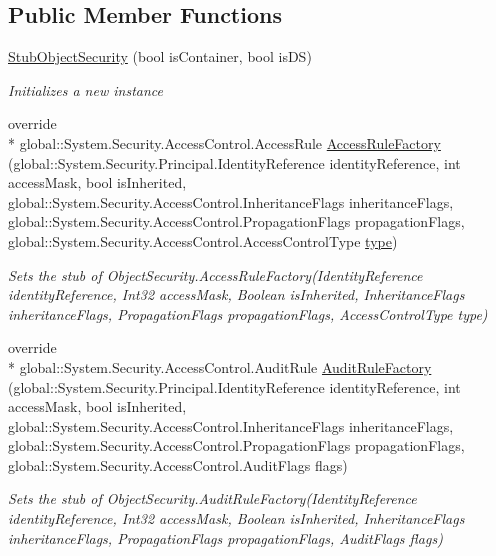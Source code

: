 \subsection*{Public Member Functions}
\begin{DoxyCompactItemize}
\item 
\hyperlink{class_system_1_1_security_1_1_access_control_1_1_fakes_1_1_stub_object_security_a90af0874159857fc604873cff276dc73}{Stub\-Object\-Security} (bool is\-Container, bool is\-D\-S)
\begin{DoxyCompactList}\small\item\em Initializes a new instance\end{DoxyCompactList}\item 
override \\*
global\-::\-System.\-Security.\-Access\-Control.\-Access\-Rule \hyperlink{class_system_1_1_security_1_1_access_control_1_1_fakes_1_1_stub_object_security_adc29237b5d47a9d024d2fd27999d512f}{Access\-Rule\-Factory} (global\-::\-System.\-Security.\-Principal.\-Identity\-Reference identity\-Reference, int access\-Mask, bool is\-Inherited, global\-::\-System.\-Security.\-Access\-Control.\-Inheritance\-Flags inheritance\-Flags, global\-::\-System.\-Security.\-Access\-Control.\-Propagation\-Flags propagation\-Flags, global\-::\-System.\-Security.\-Access\-Control.\-Access\-Control\-Type \hyperlink{jquery-1_810_82-vsdoc_8js_a3940565e83a9bfd10d95ffd27536da91}{type})
\begin{DoxyCompactList}\small\item\em Sets the stub of Object\-Security.\-Access\-Rule\-Factory(\-Identity\-Reference identity\-Reference, Int32 access\-Mask, Boolean is\-Inherited, Inheritance\-Flags inheritance\-Flags, Propagation\-Flags propagation\-Flags, Access\-Control\-Type type)\end{DoxyCompactList}\item 
override \\*
global\-::\-System.\-Security.\-Access\-Control.\-Audit\-Rule \hyperlink{class_system_1_1_security_1_1_access_control_1_1_fakes_1_1_stub_object_security_a0eed9829e655f3bf282d29efd3dc454e}{Audit\-Rule\-Factory} (global\-::\-System.\-Security.\-Principal.\-Identity\-Reference identity\-Reference, int access\-Mask, bool is\-Inherited, global\-::\-System.\-Security.\-Access\-Control.\-Inheritance\-Flags inheritance\-Flags, global\-::\-System.\-Security.\-Access\-Control.\-Propagation\-Flags propagation\-Flags, global\-::\-System.\-Security.\-Access\-Control.\-Audit\-Flags flags)
\begin{DoxyCompactList}\small\item\em Sets the stub of Object\-Security.\-Audit\-Rule\-Factory(\-Identity\-Reference identity\-Reference, Int32 access\-Mask, Boolean is\-Inherited, Inheritance\-Flags inheritance\-Flags, Propagation\-Flags propagation\-Flags, Audit\-Flags flags)\end{DoxyCompactList}\item 

\end{DoxyCompactItemize}
